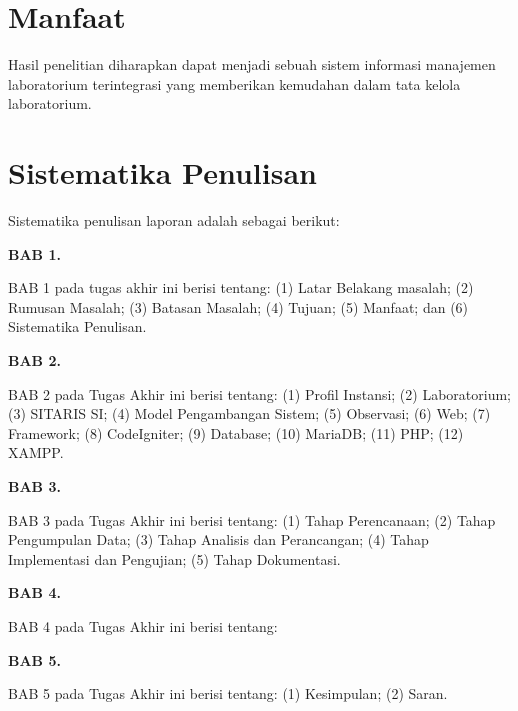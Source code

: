 \section{Manfaat}
Hasil penelitian diharapkan dapat menjadi sebuah sistem informasi manajemen laboratorium terintegrasi yang memberikan kemudahan dalam tata kelola laboratorium.
\section{Sistematika Penulisan}
Sistematika penulisan laporan adalah sebagai berikut:

\textbf{BAB 1. \babSatu}

BAB 1 pada tugas akhir ini berisi tentang: (1) Latar Belakang masalah; (2) Rumusan Masalah; (3) Batasan Masalah; (4) Tujuan; (5) Manfaat; dan (6) Sistematika Penulisan.

\textbf{BAB 2. \babDua}

BAB 2 pada Tugas Akhir ini berisi tentang: (1) Profil Instansi; (2) Laboratorium; (3) SITARIS SI; (4) Model Pengambangan Sistem; (5) Observasi; (6) Web; (7) Framework; (8) CodeIgniter; (9) Database; (10) MariaDB; (11) PHP; (12) XAMPP.

\textbf{BAB 3. \babTiga}

BAB 3 pada Tugas Akhir ini berisi tentang: (1) Tahap Perencanaan; (2) Tahap Pengumpulan Data; (3) Tahap Analisis dan Perancangan; (4) Tahap Implementasi dan Pengujian; (5) Tahap Dokumentasi.

\textbf{BAB 4. \babEmpat}

BAB 4 pada Tugas Akhir ini berisi tentang:

\textbf{BAB 5. \babLima}

BAB 5 pada Tugas Akhir ini berisi tentang: (1) Kesimpulan; (2) Saran.
